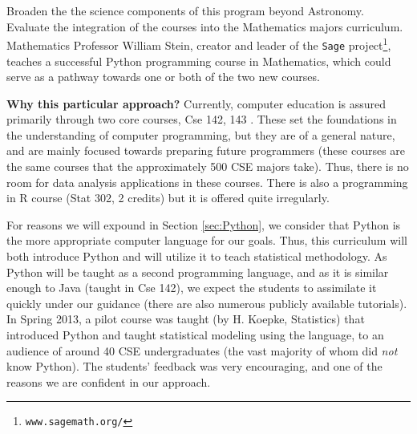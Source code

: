 Broaden the the science components of this program beyond Astronomy.
Evaluate the integration of the courses into the Mathematics majors
curriculum. Mathematics Professor William Stein, creator and leader of
the {\tt Sage} project\footnote{{\tt www.sagemath.org/}}, teaches a
successful Python programming course in Mathematics, which could serve
as a pathway towards one or both of the two new courses.


{\bf Why this particular approach?} Currently, computer education is
assured primarily through two core courses, {\sc Cse 142, 143}
\cite{Reges:java}. These set the foundations in the understanding of
computer programming, but they are of a general nature, and are mainly
focused towards preparing future programmers  (these courses are the
same courses that the approximately 500 CSE majors take). Thus, there
is no room for data analysis applications in these courses.  There is
also a programming in R course ({\sc Stat 302}, 2 credits) but it is 
offered quite irregularly.

For reasons we will expound in Section \ref{sec:Python}, we
consider that Python is the more appropriate computer language for our
goals. Thus, this curriculum will both introduce Python and will utilize it to
teach statistical methodology.  As Python will be taught as a second
programming language, and as it is similar enough to Java (taught in
{\sc Cse 142}), we expect the students to assimilate it quickly under our
guidance (there are also numerous publicly available tutorials).
In Spring 2013, a pilot course was taught (by H. Koepke,
Statistics) that introduced Python and taught statistical modeling
using the language, to an audience of around 40 CSE undergraduates
(the vast majority of whom did {\em not} know Python). The students'
feedback was very encouraging, and one of the reasons we are confident
in our approach.



